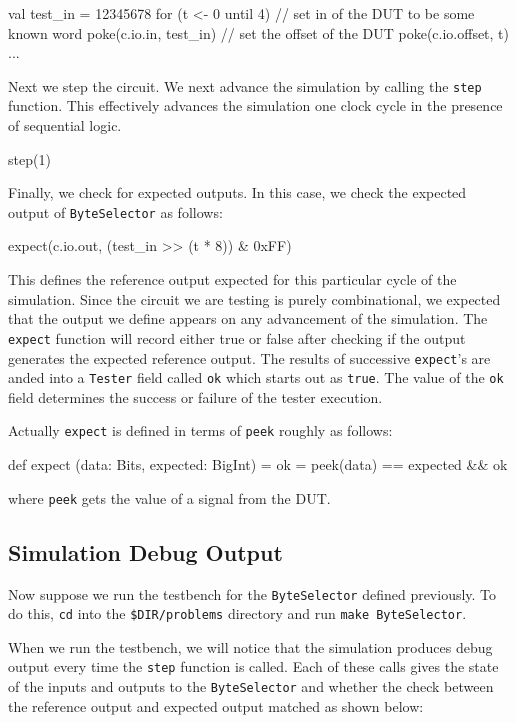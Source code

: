 \begin{scala}
val test_in = 12345678
for (t <- 0 until 4) {
  // set in of the DUT to be some known word
  poke(c.io.in,     test_in)
  // set the offset of the DUT
  poke(c.io.offset, t)
  ...
}
\end{scala}

Next we step the circuit.  We next advance the simulation by calling the \verb+step+ function. This effectively advances the simulation one clock cycle in the presence of sequential logic. 

\begin{scala}
step(1)
\end{scala}

Finally, we check for expected outputs.
In this case, we check the expected output of \verb+ByteSelector+ as follows:

\begin{scala}
expect(c.io.out, (test_in >> (t * 8)) & 0xFF)
\end{scala}

This defines the reference output expected for this particular cycle of the simulation. Since the circuit we are testing is purely combinational, we expected that the output we define appears on any advancement of the simulation.  The \verb+expect+ function will record either true or false after checking if the output generates the expected reference output. The results of successive \verb+expect+'s are anded into a \verb+Tester+ field called \verb+ok+ which starts out as \verb+true+.  The value of the \verb+ok+ field determines the success or failure of the tester execution.

Actually \verb+expect+ is defined in terms of \verb+peek+ roughly as follows:

\begin{scala}
def expect (data: Bits, expected: BigInt) = 
  ok = peek(data) == expected && ok
\end{scala}

where \verb+peek+ gets the value of a signal from the DUT.

\subsection{Simulation Debug Output}

Now suppose we run the testbench for the \verb+ByteSelector+ defined previously. To do this, \verb+cd+ into the \verb+$DIR/problems+ directory and run \verb+make ByteSelector+.

When we run the testbench, we will notice that the simulation produces debug output every time the \verb+step+ function is called. Each of these calls gives the state of the inputs and outputs to the \verb+ByteSelector+ and whether the check between the reference output and expected output matched as shown below:

